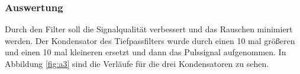 \documentclass[12pt,a4paper]{article}
\begin{document}
\subsubsection*{Auswertung}

Durch den Filter soll die Signalqualität verbessert und das Rauschen minimiert werden. Der Kondensator des Tiefpassfilters wurde durch einen 10 mal größeren und einen 10 mal kleineren ersetzt und dann das Pulssignal aufgenommen. In Abbildung \ref{fig:a3} sind die Verläufe für die drei Kondensatoren zu sehen.
\end{document}
